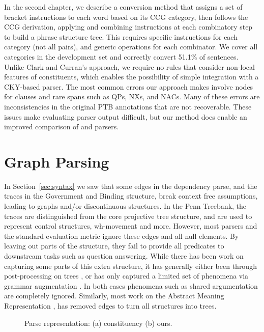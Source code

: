 In the second chapter, we describe a conversion method that assigns a set of bracket instructions to each word based on its CCG category, then follows the CCG derivation, applying and combining instructions at each combinatory step to build a phrase structure tree.
This requires specific instructions for each category (not all pairs), and generic operations for each combinator.
We cover all categories in the development set and correctly convert 51.1\% of sentences.
Unlike Clark and Curran's approach, we require no rules that consider non-local features of constituents, which enables the possibility of simple integration with a CKY-based parser.
The most common errors our approach makes involve nodes for clauses and rare spans such as QPs, NXs, and NACs.
Many of these errors are inconsistencies in the original PTB annotations that are not recoverable.
These issues make evaluating parser output difficult, but our method does enable an improved comparison of \ccg and \ptb parsers.

\section{Graph Parsing}

In Section~\ref{sec:syntax} we saw that some edges in the dependency parse, and the traces in the Government and Binding structure, break context free assumptions, leading to graphs and/or discontinuous structures.
In the Penn Treebank, the traces are distinguished from the core projective tree structure, and are used to represent control structures, wh-movement and more.
However, most parsers and the standard evaluation metric ignore these edges and all null elements.
By leaving out parts of the structure, they fail to provide all predicates to downstream tasks such as question answering.
While there has been work on capturing some parts of this extra structure, it has generally either been through post-processing on trees \parencite{Johnson:2002,Jijkoun:2003,Campbell:2004,Levy:2004,Gabbard:2006}, or has only captured a limited set of phenomena via grammar augmentation \parencite{collins:1997,dienes-dubey:2003,schmid:2006,cai-chiang-goldberg:2011}.
In both cases phenomena such as shared argumentation are completely ignored.
Similarly, most work on the Abstract Meaning Representation \parencite{amr}, has removed edges to turn all structures into trees.

\begin{figure}
  \centering
  \scalebox{1.0}{
    
  }
  \caption{\label{fig:repr}
    Parse representation: (a) constituency (b) ours.
  }
\end{figure}

